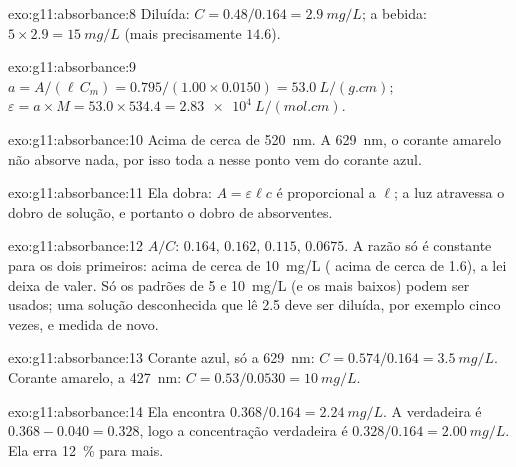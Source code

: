 \begin{solution}{exo:g11:absorbance:8}
Diluída: $C = 0.48 / 0.164 = \qty{2.9}{mg/L}$; a bebida:
$5 \times 2.9 = \qty{15}{mg/L}$ (mais precisamente $14.6$).
\end{solution}

\begin{solution}{exo:g11:absorbance:9}
$a = A / (\ell\, C_m) = 0.795 / (1.00 \times 0.0150) = \qty{53.0}{L/(g.cm)}$;
$\varepsilon = a \times M = 53.0 \times 534.4 = \qty{2.83e4}{L/(mol.cm)}$.
\end{solution}

\begin{solution}{exo:g11:absorbance:10}
Acima de cerca de \qty{520}{nm}. A \qty{629}{nm}, o corante amarelo não
absorve nada, por isso toda a  nesse ponto vem do corante
azul.
\end{solution}

\begin{solution}{exo:g11:absorbance:11}
Ela dobra: $A = \varepsilon \ell c$ é proporcional a $\ell$; a luz
atravessa o dobro de solução, e portanto o dobro de 
absorventes.
\end{solution}

\begin{solution}{exo:g11:absorbance:12}
$A/C$: $0.164$, $0.162$, $0.115$, $0.0675$. A razão só é constante para
os dois primeiros: acima de cerca de \qty{10}{mg/L} ( acima
de cerca de 1.6), a lei deixa de valer. Só os padrões de 5 e
\qty{10}{mg/L} (e os mais baixos) podem ser usados; uma solução
desconhecida que lê 2.5 deve ser diluída, por exemplo cinco vezes, e
medida de novo.
\end{solution}

\begin{solution}{exo:g11:absorbance:13}
Corante azul, só a \qty{629}{nm}: $C = 0.574 / 0.164 = \qty{3.5}{mg/L}$.
Corante amarelo, a \qty{427}{nm}: $C = 0.53 / 0.0530 = \qty{10}{mg/L}$.
\end{solution}

\begin{solution}{exo:g11:absorbance:14}
Ela encontra $0.368 / 0.164 = \qty{2.24}{mg/L}$. A  verdadeira
é $0.368 - 0.040 = 0.328$, logo a concentração verdadeira é
$0.328 / 0.164 = \qty{2.00}{mg/L}$. Ela erra \qty{12}{\percent} para
mais.
\end{solution}

